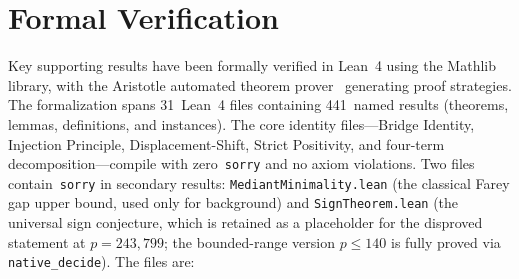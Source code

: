 \documentclass[11pt]{article}
\theoremstyle{definition}
\begin{document}
\section{Formal Verification}\label{sec:formal}

Key supporting results have been formally verified in Lean~4
using the Mathlib library, with the Aristotle automated theorem
prover~\cite{Aristotle2025} generating proof strategies.
The formalization spans 31~Lean~4 files containing 441~named
results (theorems, lemmas, definitions, and instances).
The core identity files---Bridge Identity, Injection Principle,
Displacement-Shift, Strict Positivity, and four-term
decomposition---compile with zero~\texttt{sorry} and no axiom
violations.  Two files contain~\texttt{sorry} in secondary
results: \texttt{MediantMinimality.lean} (the classical Farey
gap upper bound, used only for background) and
\texttt{SignTheorem.lean} (the universal sign conjecture,
which is retained as a placeholder for the disproved statement
at $p = 243{,}799$; the bounded-range version
$p \le 140$ is fully proved via \texttt{native\_decide}).  The files are:
\end{document}
